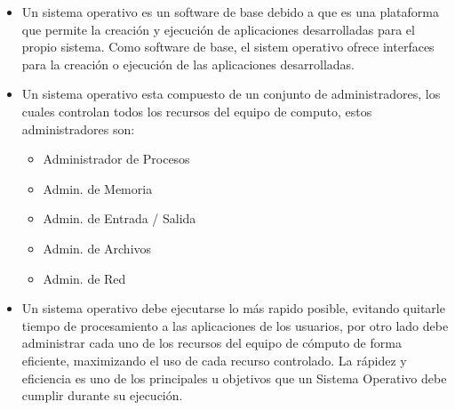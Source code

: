 \documentclass[12pt, fleqn]{report}                             %
\begin{document}
                    \begin{itemize}
                        \item 
                            Un sistema operativo es un software de base debido a que es una plataforma que permite
                            la creación y ejecución de aplicaciones desarrolladas para el propio sistema.
                            Como software de base, el sistem operativo ofrece interfaces para la creación o ejecución
                            de las aplicaciones desarrolladas.

                        \item
                            Un sistema operativo esta compuesto de un conjunto de administradores, los cuales controlan
                            todos los recursos del equipo de computo, estos administradores son: 

                            \begin{itemize}
                                \item Administrador de Procesos
                                \item Admin. de Memoria 
                                \item Admin. de Entrada / Salida 
                                \item Admin. de Archivos 
                                \item Admin. de Red 
                            \end{itemize}

                        \item
                            Un sistema operativo debe ejecutarse lo más rapido posible, evitando quitarle tiempo de
                            procesamiento a las aplicaciones de los usuarios, por otro lado debe administrar cada uno
                            de los recursos del equipo de cómputo de forma eficiente, maximizando el uso de cada
                            recurso controlado. 
                            La rápidez y eficiencia es uno de los principales u objetivos que un Sistema Operativo debe
                            cumplir durante su ejecución.
                
                    \end{itemize}
                

        \clearpage
\end{document}
